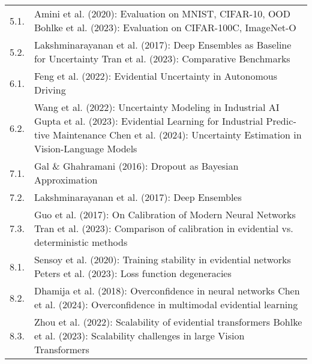 \begin{otherlanguage}{ngerman}
\begin{table}[htbp]
\begin{tabularx}{\textwidth}{|l|X|}
5.1. & Amini et al. (2020): Evaluation on MNIST, CIFAR-10, OOD \cite{amini2020deep} \newline
         Bohlke et al. (2023): Evaluation on CIFAR-100C, ImageNet-O \cite{bohlke2023evidentialvit} \\ 
5.2. & Lakshminarayanan et al. (2017): Deep Ensembles as Baseline for Uncertainty \cite{lakshminarayanan2017simple} \newline
         Tran et al. (2023): Comparative Benchmarks \cite{tran2023separating} \\ \hline

6.1. & Feng et al. (2022): Evidential Uncertainty in Autonomous Driving \cite{feng2022review} \\ 
6.2. & Wang et al. (2022): Uncertainty Modeling in Industrial AI \cite{wang2022uncertainty} \newline
         Gupta et al. (2023): Evidential Learning for Industrial Predictive Maintenance \cite{gupta2023industrialedl} \newline
         Chen et al. (2024): Uncertainty Estimation in Vision-Language Models \cite{chen2024vlm} \\ \hline

7.1. & Gal \& Ghahramani (2016): Dropout as Bayesian Approximation \cite{gal2016dropout} \\ 
7.2. & Lakshminarayanan et al. (2017): Deep Ensembles \cite{lakshminarayanan2017simple} \\ 
7.3. & Guo et al. (2017): On Calibration of Modern Neural Networks \cite{guo2017calibration} \newline
         Tran et al. (2023): Comparison of calibration in evidential vs. deterministic methods \cite{tran2023separating} \\ \hline

8.1. & Sensoy et al. (2020): Training stability in evidential networks \cite{sensoy2020uncertainty} \newline
         Peters et al. (2023): Loss function degeneracies \cite{peters2023consistency} \\ 
8.2. & Dhamija et al. (2018): Overconfidence in neural networks \cite{dhamija2018reducing} \newline
         Chen et al. (2024): Overconfidence in multimodal evidential learning \cite{chen2024vlm} \\ 
8.3. & Zhou et al. (2022): Scalability of evidential transformers \cite{zhou2022evidential} \newline
         Bohlke et al. (2023): Scalability challenges in large Vision Transformers \cite{bohlke2023evidentialvit} \\ \hline


\end{tabularx}
\end{table}
\end{otherlanguage}
